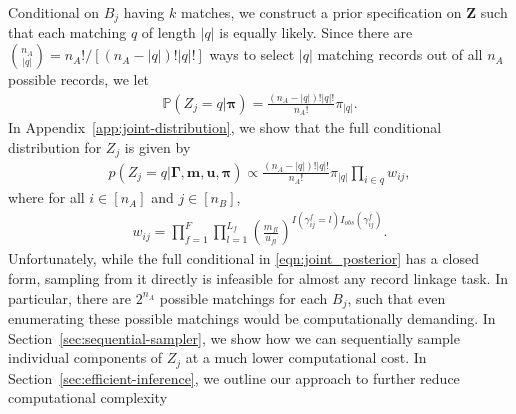 \documentclass[12pt,letterpaper]{article}
\newcommand{\1}[1]{\mathbb{I}\!\left[#1\right]} %
\begin{document}
Conditional on $B_j$ having $k$ matches, we construct a prior specification on $\bm{Z}$ such that each matching $q$ of length $|q|$ is equally likely. Since there are ${n_A \choose |q|} = n_A!/ [(n_A - |q|)! |q|!]$ ways to select $|q|$ matching records out of all $n_A$ possible records, we let
\begin{align} \label{eqn:drl-prior}
	\mathbb{P}(Z_j = q| \bm{\pi}) = \frac{(n_A - |q|)! |q|!}{n_A!} \pi_{|q|}. 
\end{align}
In Appendix~\ref{app:joint-distribution}, we show that the full conditional distribution for $Z_j$ is given by
\begin{align} \label{eqn:joint_posterior}
		p\left(Z_j  = q|\bm{\Gamma}, \bm{m}, \bm{u}, \bm{\pi} \right) \propto \frac{(n_A - |q|)!|q|!}{n_A!} \pi_{|q|} \prod_{i \in q} w_{ij}, 
\end{align}
where for all $i \in [n_A]$ and $j \in [n_B]$, 
\begin{align*}
	w_{ij} = \prod_{f=1}^{F}\prod_{l = 1}^{L_f} \left(\frac{m_{fl}}{u_{fl}}\right)^{I(\gamma_{ij}^f = l)I_{obs}(\gamma_{ij}^f)} .
\end{align*}
Unfortunately, while the full conditional in \eqref{eqn:joint_posterior} has a closed form, sampling from it directly is infeasible for almost any record linkage task. In particular, there are $2^{n_A}$ possible matchings for each $B_j$, such that even enumerating these possible matchings would be computationally demanding. In Section~\ref{sec:sequential-sampler}, we show how we can sequentially sample individual components of $Z_j$ at a much lower computational cost. In Section~\ref{sec:efficient-inference}, we outline our approach to further reduce computational complexity
\end{document}
